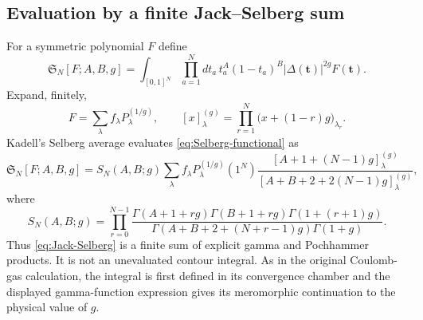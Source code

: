 \documentclass[11pt]{article}
\begin{document}
\subsection{Evaluation by a finite Jack--Selberg sum}

For a symmetric polynomial $F$ define
\begin{equation}
 \mathfrak S_N[F;A,B,g]
 =\int_{[0,1]^N}\prod_{a=1}^Ndt_a\,
 t_a^A(1-t_a)^B|\Delta(\boldsymbol t)|^{2g}F(\boldsymbol t).
 \label{eq:Selberg-functional}
\end{equation}
Expand, finitely,
\begin{equation}
 F=\sum_\lambda f_\lambda P_\lambda^{(1/g)},\qquad
 [x]_{\lambda}^{(g)}=
 \prod_{r=1}^N\bigl(x+(1-r)g\bigr)_{\lambda_r}.
 \label{eq:Jack-expansion}
\end{equation}
Kadell's Selberg average evaluates \eqref{eq:Selberg-functional} as
\begin{equation}
 \mathfrak S_N[F;A,B,g]
 =S_N(A,B;g)\sum_\lambda f_\lambda
 P_\lambda^{(1/g)}(1^N)
 \frac{[A+1+(N-1)g]_{\lambda}^{(g)}}
 {[A+B+2+2(N-1)g]_{\lambda}^{(g)}},
 \label{eq:Jack-Selberg}
\end{equation}
where
\begin{equation}
 S_N(A,B;g)=\prod_{r=0}^{N-1}
 \frac{\Gamma(A+1+rg)\Gamma(B+1+rg)
 \Gamma(1+(r+1)g)}
 {\Gamma(A+B+2+(N+r-1)g)\Gamma(1+g)}.
 \label{eq:Selberg}
\end{equation}
Thus \eqref{eq:Jack-Selberg} is a finite sum of explicit gamma and
Pochhammer products.  It is not an unevaluated contour integral.  As in the
original Coulomb-gas calculation, the integral is first defined in its
convergence chamber and the displayed gamma-function expression gives its
meromorphic continuation to the physical value of $g$.
\end{document}
